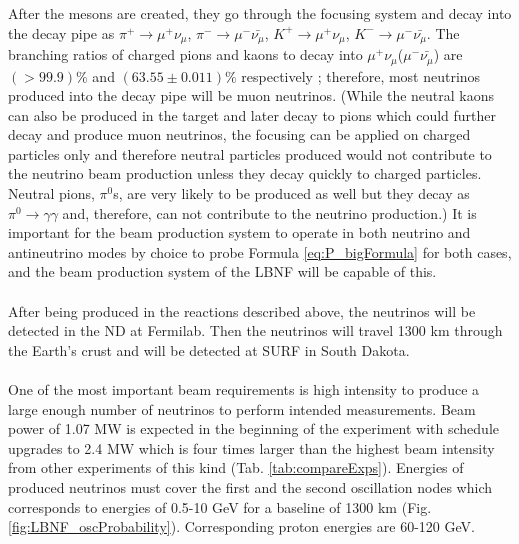 After the mesons are created, they go through the focusing system and decay into the decay pipe as $\pi^+ \rightarrow \mu^+\nu_\mu$, $\pi^- \rightarrow \mu^-\bar{\nu_\mu}$, $K^+ \rightarrow \mu^+\nu_\mu$, $K^- \rightarrow \mu^-\bar{\nu_\mu}$. The branching ratios of charged pions and kaons to decay into $\mu^+\nu_\mu$($\mu^-\bar{\nu_\mu}$) are $(>99.9)\%$ and $(63.55\pm0.011)\%$ respectively \cite{ref_PDG}; therefore, most neutrinos produced into the decay pipe will be muon neutrinos. (While the neutral kaons can also be produced in the target and later decay to pions which could further decay and produce muon neutrinos, the focusing can be applied on charged particles only and therefore neutral particles produced would not contribute to the neutrino beam production unless they decay quickly to charged particles. Neutral pions, $\pi^0$s, are very likely to be produced as well but they decay as $\pi^0 \rightarrow \gamma\gamma$ and, therefore, can not contribute to the neutrino production.) It is important for the beam production system to operate in both neutrino and antineutrino modes by choice to probe Formula \ref{eq:P_bigFormula} for both cases, and the beam production system of the LBNF will be capable of this.\\ \\
After being produced in the reactions described above, the neutrinos will be detected in the ND at Fermilab. Then the neutrinos will travel 1300 km through the Earth's crust and will be detected at SURF in South Dakota.\\  \\
One of the most important beam requirements is high intensity to produce a large enough number of neutrinos to perform intended measurements. Beam power of 1.07 MW is expected in the beginning of the experiment with schedule upgrades to 2.4 MW which is four times larger than the highest beam intensity from other experiments of this kind (Tab. \ref{tab:compareExps}). Energies of produced neutrinos must cover the first and the second oscillation nodes which corresponds to energies of 0.5-10 GeV for a baseline of 1300 km (Fig. \ref{fig:LBNF_oscProbability}). Corresponding proton energies are 60-120 GeV.\\ \\
